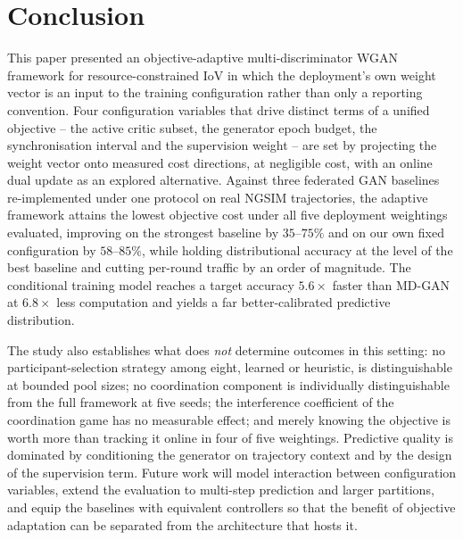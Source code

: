 \documentclass[journal]{IEEEtran}
\begin{document}
\section{Conclusion}
\label{sec:conclusion}
This paper presented an objective-adaptive multi-discriminator WGAN framework
for resource-constrained IoV in which the deployment's own weight vector is an
input to the training configuration rather than only a reporting convention.
Four configuration variables that drive distinct terms of a unified objective --
the active critic subset, the generator epoch budget, the synchronisation
interval and the supervision weight -- are set by projecting the weight vector
onto measured cost directions, at negligible cost, with an online dual update
as an explored alternative. Against three federated GAN baselines
re-implemented under one protocol on real NGSIM trajectories, the adaptive
framework attains the lowest objective cost under all five deployment
weightings evaluated, improving on the strongest baseline by $35$--$75\%$ and
on our own fixed configuration by $58$--$85\%$, while holding distributional
accuracy at the level of the best baseline and cutting per-round traffic by an
order of magnitude. The conditional training model reaches a target accuracy
$5.6\times$ faster than MD-GAN at $6.8\times$ less computation and yields a far
better-calibrated predictive distribution.

The study also establishes what does \emph{not} determine outcomes in this
setting: no participant-selection strategy among eight, learned or heuristic,
is distinguishable at bounded pool sizes; no coordination component is
individually distinguishable from the full framework at five seeds; the
interference coefficient of the coordination game has no measurable effect;
and merely knowing the objective is worth more than tracking it online in four
of five weightings. Predictive quality is dominated by conditioning the
generator on trajectory context and by the design of the supervision term.
Future work will model interaction between configuration variables, extend the
evaluation to multi-step prediction and larger partitions, and equip the
baselines with equivalent controllers so that the benefit of objective
adaptation can be separated from the architecture that hosts it.
\end{document}
